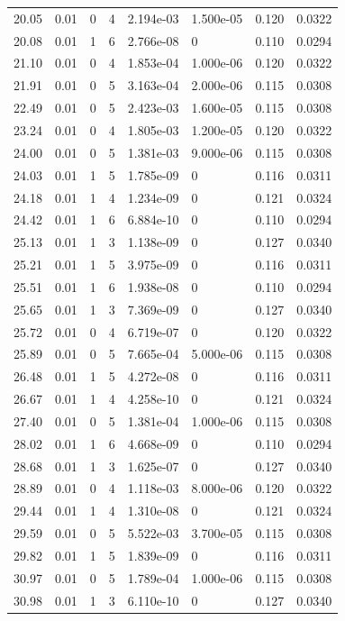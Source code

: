 \documentclass[preview]{standalone}
\begin{document}
{{{\begin{tabular}{L{1.2cm}C{1.2cm} C{0.3cm}C{0.5cm} C{1.4cm}C{1.4cm} C{1.4cm}C{1.4cm}}
  20.05  &  0.01  & 0     &  4 &  2.194e-03  & 1.500e-05  & 0.120 &  0.0322   \\ 
  20.08  &  0.01  & 1     &  6 &  2.766e-08  & 0  & 0.110 &  0.0294   \\ 
  21.10  &  0.01  & 0     &  4 &  1.853e-04  & 1.000e-06  & 0.120 &  0.0322   \\ 
  21.91  &  0.01  & 0     &  5 &  3.163e-04  & 2.000e-06  & 0.115 &  0.0308   \\ 
  22.49  &  0.01  & 0     &  5 &  2.423e-03  & 1.600e-05  & 0.115 &  0.0308   \\ 
  23.24  &  0.01  & 0     &  4 &  1.805e-03  & 1.200e-05  & 0.120 &  0.0322   \\ 
  24.00  &  0.01  & 0     &  5 &  1.381e-03  & 9.000e-06  & 0.115 &  0.0308   \\ 
  24.03  &  0.01  & 1     &  5 &  1.785e-09  & 0  & 0.116 &  0.0311   \\ 
  24.18  &  0.01  & 1     &  4 &  1.234e-09  & 0  & 0.121 &  0.0324   \\ 
  24.42  &  0.01  & 1     &  6 &  6.884e-10  & 0  & 0.110 &  0.0294   \\ 
  25.13  &  0.01  & 1     &  3 &  1.138e-09  & 0  & 0.127 &  0.0340   \\ 
  25.21  &  0.01  & 1     &  5 &  3.975e-09  & 0  & 0.116 &  0.0311   \\ 
  25.51  &  0.01  & 1     &  6 &  1.938e-08  & 0  & 0.110 &  0.0294   \\ 
  25.65  &  0.01  & 1     &  3 &  7.369e-09  & 0  & 0.127 &  0.0340   \\ 
  25.72  &  0.01  & 0     &  4 &  6.719e-07  & 0  & 0.120 &  0.0322   \\ 
  25.89  &  0.01  & 0     &  5 &  7.665e-04  & 5.000e-06  & 0.115 &  0.0308   \\ 
  26.48  &  0.01  & 1     &  5 &  4.272e-08  & 0  & 0.116 &  0.0311   \\ 
  26.67  &  0.01  & 1     &  4 &  4.258e-10  & 0  & 0.121 &  0.0324   \\ 
  27.40  &  0.01  & 0     &  5 &  1.381e-04  & 1.000e-06  & 0.115 &  0.0308   \\ 
  28.02  &  0.01  & 1     &  6 &  4.668e-09  & 0  & 0.110 &  0.0294   \\ 
  28.68  &  0.01  & 1     &  3 &  1.625e-07  & 0  & 0.127 &  0.0340   \\ 
  28.89  &  0.01  & 0     &  4 &  1.118e-03  & 8.000e-06  & 0.120 &  0.0322   \\ 
  29.44  &  0.01  & 1     &  4 &  1.310e-08  & 0  & 0.121 &  0.0324   \\ 
  29.59  &  0.01  & 0     &  5 &  5.522e-03  & 3.700e-05  & 0.115 &  0.0308   \\ 
  29.82  &  0.01  & 1     &  5 &  1.839e-09  & 0  & 0.116 &  0.0311   \\ 
  30.97  &  0.01  & 0     &  5 &  1.789e-04  & 1.000e-06  & 0.115 &  0.0308   \\ 
  30.98  &  0.01  & 1     &  3 &  6.110e-10  & 0  & 0.127 &  0.0340   \\ 
\hline 
\end{tabular} 

}}}
\end{document}
